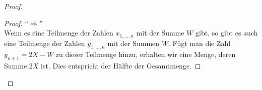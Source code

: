 \documentclass[a4paper]{scrartcl}
\begin{document}
\begin{enumerate}[label=\bfseries \arabic*.]
\begin{enumerate}
\begin{proof}
\begin{enumerate}
\begin{proof}
                    ``$\Rightarrow$'' \\
                    Wenn es eine Teilmenge der Zahlen $x_{1,...,n}$ mit der Summe $W$ gibt, so gibt es auch eine Teilmenge der Zahlen $y_{1,...,n}$
                    mit der Summen $W$.
                    Fügt man die Zahl $y_{n+1} = 2X - W$ zu dieser Teilmenge hinzu, erhalten wir eine Menge, deren Summe $2X$ ist.
                    Dies entspricht der Hälfte der Gesamtmenge.


                \end{proof}

        \end{enumerate}
    \end{proof}
\end{enumerate}

\end{enumerate}
\end{document}
